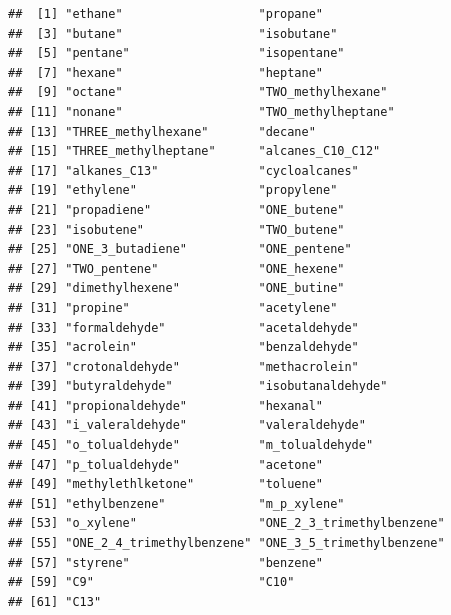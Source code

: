 \documentclass[12pt,graybox,envcountchap,sectrefs]{krantz}
\makeatletter
\newenvironment{Shaded}{\begin{snugshade}}{\end{snugshade}}
\newcommand{\KeywordTok}[1]{\textcolor[rgb]{0.13,0.29,0.53}{\textbf{#1}}}
\newcommand{\DataTypeTok}[1]{\textcolor[rgb]{0.13,0.29,0.53}{#1}}
\newcommand{\StringTok}[1]{\textcolor[rgb]{0.31,0.60,0.02}{#1}}
\newcommand{\CommentTok}[1]{\textcolor[rgb]{0.56,0.35,0.01}{\textit{#1}}}
\newcommand{\OperatorTok}[1]{\textcolor[rgb]{0.81,0.36,0.00}{\textbf{#1}}}
\newcommand{\NormalTok}[1]{#1}
\newenvironment{kframe}{%
\medskip{}
\setlength{\fboxsep}{.8em}
 \def\at@end@of@kframe{}%
 \ifinner\ifhmode%
  \def\at@end@of@kframe{\end{minipage}}%
  \begin{minipage}{\columnwidth}%
 \fi\fi%
 \def\FrameCommand##1{\hskip\@totalleftmargin \hskip-\fboxsep
 \colorbox{shadecolor}{##1}\hskip-\fboxsep
     \hskip-\linewidth \hskip-\@totalleftmargin \hskip\columnwidth}%
 \MakeFramed {\advance\hsize-\width
   \@totalleftmargin\z@ \linewidth\hsize
   \@setminipage}}%
 {\par\unskip\endMakeFramed%
 \at@end@of@kframe}
\renewenvironment{Shaded}{\begin{kframe}}{\end{kframe}}
\theoremstyle{definition}
\theoremstyle{definition}
\theoremstyle{definition}
\theoremstyle{remark}
\makeatother
\begin{document}
\begin{Shaded}
\end{Shaded}

\begin{verbatim}
##  [1] "ethane"                   "propane"                 
##  [3] "butane"                   "isobutane"               
##  [5] "pentane"                  "isopentane"              
##  [7] "hexane"                   "heptane"                 
##  [9] "octane"                   "TWO_methylhexane"        
## [11] "nonane"                   "TWO_methylheptane"       
## [13] "THREE_methylhexane"       "decane"                  
## [15] "THREE_methylheptane"      "alcanes_C10_C12"         
## [17] "alkanes_C13"              "cycloalcanes"            
## [19] "ethylene"                 "propylene"               
## [21] "propadiene"               "ONE_butene"              
## [23] "isobutene"                "TWO_butene"              
## [25] "ONE_3_butadiene"          "ONE_pentene"             
## [27] "TWO_pentene"              "ONE_hexene"              
## [29] "dimethylhexene"           "ONE_butine"              
## [31] "propine"                  "acetylene"               
## [33] "formaldehyde"             "acetaldehyde"            
## [35] "acrolein"                 "benzaldehyde"            
## [37] "crotonaldehyde"           "methacrolein"            
## [39] "butyraldehyde"            "isobutanaldehyde"        
## [41] "propionaldehyde"          "hexanal"                 
## [43] "i_valeraldehyde"          "valeraldehyde"           
## [45] "o_tolualdehyde"           "m_tolualdehyde"          
## [47] "p_tolualdehyde"           "acetone"                 
## [49] "methylethlketone"         "toluene"                 
## [51] "ethylbenzene"             "m_p_xylene"              
## [53] "o_xylene"                 "ONE_2_3_trimethylbenzene"
## [55] "ONE_2_4_trimethylbenzene" "ONE_3_5_trimethylbenzene"
## [57] "styrene"                  "benzene"                 
## [59] "C9"                       "C10"                     
## [61] "C13"
\end{verbatim}
\end{document}

